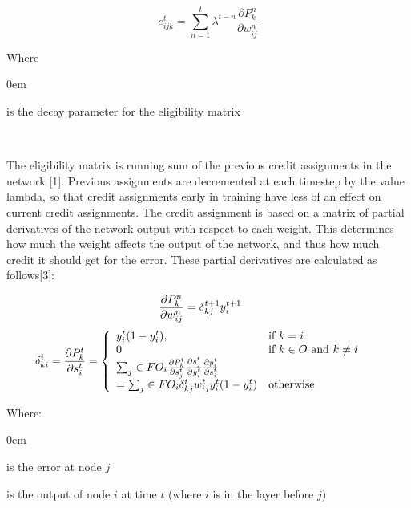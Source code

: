 \documentclass{sig-alternate-05-2015}
\begin{document}
\begin{equation}
e_{ijk}^t = \sum_{n=1}^{t} \lambda^{t-n} \frac{\partial P_k^n}{\partial w_{ij}^n}
\end{equation}

Where
\begin{description}
\itemsep0em 
\item [\lambda] is the decay parameter for the eligibility matrix
\end{description} 
\

The eligibility matrix is running sum of the previous credit assignments in the network [1]. Previous assignments are decremented at each timestep by the value lambda, so that credit assignments early in training have less of an effect on current credit assignments. The credit assignment is based on a matrix of partial derivatives of the network output with respect to each weight. This determines how much the weight affects the output of the network, and thus how much credit it should get for the error. These partial derivatives are calculated as follows[3]:

\begin{equation}
\hspace*{-.5cm}\frac{\partial P_k^n}{\partial w_{ij}^n} = \delta_{kj}^{t+1} y_i^{t+1}
\end{equation}
\begin{equation}
\hspace*{-.5cm}\delta_{ki}^{i}= \frac{\partial P_k^t}{\partial s_{i}^t} =
\left\{
	\begin{array}{lll}
		y_{i}^{t} (1 - y_{i}^{t}), & \mbox{if } k = i \\
		0 & \mbox{if } k \in  O \text{ and } k \neq i\\
		\sum_{j} \in FO_i \frac{\partial P_k^t}{\partial s_{j}^t} \frac{\partial s_j^t}{\partial y_{i}^t} \frac{\partial y_i^t}{\partial s_{i}^t}\\ =  
		\sum_{j} \in FO_i \delta_{kj}^{t} w_{ij}^{t} y_i^t (1 - y_i^t) & \mbox{otherwise}
	\end{array}
\right.
\end{equation}

Where:
\begin{description}
\itemsep0em 
\item [\delta_{ki}^i] is the error at node $j$
\item[y_i^t] is the output of node $i$  at time $t$ (where $i$ is in the layer before $j$)
\end{description} 
\
\end{document}
